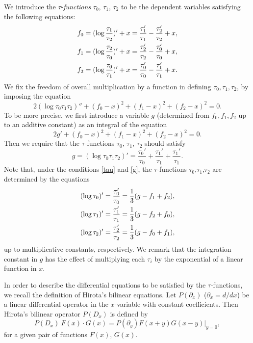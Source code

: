 We introduce the $\tau$-{\em functions} $\tau_0$, $\tau_1$, $\tau_2$ to be 
the dependent variables satisfying the following equations: 
\begin{align}
\label{tau}
f_0&=(\log{\tau_1 \over \tau_2})'+x
=\frac{\tau_1'}{\tau_1}-\frac{\tau_2'}{\tau_2}+x,\notag\\
f_1&=(\log{\tau_2\over \tau_0})'+x
=\frac{\tau_2'}{\tau_2}-\frac{\tau_0'}{\tau_0}+x,\\
f_2&=(\log{\tau_0 \over \tau_1})'+x
=\frac{\tau_0'}{\tau_0}-\frac{\tau_1'}{\tau_1}+x.\notag
\end{align}
We fix the freedom of overall multiplication by a function
in defining $\tau_0,\tau_1,\tau_2$, by imposing the equation
\begin{equation}
2 (\log \tau_0 \tau_1 \tau_2)''+(f_0-x)^2+(f_1-x)^2+(f_2-x)^2=0. 
\end{equation} 
To be more precise, we first introduce a variable $g$ (determined from 
$f_0,f_1,f_2$ up to an additive constant) as an integral of the 
equation
\begin{equation}
\label{intg}
2g'+(f_0-x)^2+(f_1-x)^2+(f_2-x)^2=0.
\end{equation}
Then we require that the $\tau$-functions $\tau_0$, $\tau_1$, $\tau_2$ 
should satisfy 
\begin{equation}
\label{g} 
g=(\log\tau_0\tau_1\tau_2)'=\frac{\tau_0'}{\tau_0}+
\frac{\tau_1'}{\tau_1}+\frac{\tau_1'}{\tau_1}.
\end{equation}
Note that, under the conditions \eqref{tau} and \eqref{g}, 
the $\tau$-functions $\tau_0$,$\tau_1$,$\tau_2$ are  
determined by the equations
\begin{equation}
\begin{align}
\label{taubyf}
(\log\tau_0)'=\frac{\tau_0'}{\tau_0}=\frac{1}{3}(g-f_1+f_2),\notag\\
(\log\tau_1)'=\frac{\tau_1'}{\tau_1}=\frac{1}{3}(g-f_2+f_0),\\
(\log\tau_2)'=\frac{\tau_2'}{\tau_2}=\frac{1}{3}(g-f_0+f_1),\notag
\end{align}
\end{equation}
up to multiplicative constants, respectively.
We remark that the integration constant in $g$ has the effect of 
multiplying each $\tau_i$ by the exponential of a linear function in $x$. 

In order to describe the differential equations to be satisfied by the 
$\tau$-functions, we recall the definition of Hirota's bilinear equations. 
Let $P(\partial_x)$ ($\partial_x=d/dx$) be a linear differential operator
in the $x$-variable with constant coefficients. 
Then Hirota's bilinear operator $P(D_x)$ is defined by 
\begin{equation}
P(D_x) \ F(x)\cdot G(x) = P(\partial_y) F(x+y)G(x-y)\vert_{y=0}, 
\end{equation}
for a given pair of functions $F(x)$, $G(x)$. 


